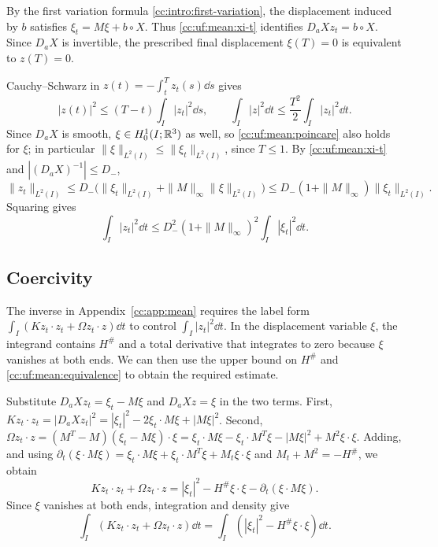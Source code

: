 By the first variation formula \eqref{cc:intro:first-variation}, the
displacement induced by $b$ satisfies $\xi_t=M\xi+b\circ X$.
Thus \eqref{cc:uf:mean:xi-t} identifies $D_aX z_t=b\circ X$.
Since $D_aX$ is invertible, the prescribed final displacement
$\xi(T)=0$ is equivalent to $z(T)=0$.

Cauchy--Schwarz in $z(t)=-\int_t^T z_t(s)\dd s$ gives
\begin{equation}\label{cc:uf:mean:poincare}
 |z(t)|^2\le(T-t)\int_I|z_t|^2\dd s,\qquad
 \int_I|z|^2\dd t\le\frac{T^2}{2}\int_I|z_t|^2\dd t.
\end{equation}
Since $D_aX$ is smooth, $\xi\in H^1_0(I;\mathbb R^3)$ as well, so
\eqref{cc:uf:mean:poincare} also holds for $\xi$; in particular
$\|\xi\|_{L^2(I)}\le\|\xi_t\|_{L^2(I)}$, since $T\le1$. By
\eqref{cc:uf:mean:xi-t} and $|(D_aX)^{-1}|\le D_-$,
\[
 \|z_t\|_{L^2(I)}
 \le D_-\bigl(\|\xi_t\|_{L^2(I)}+\|M\|_\infty\|\xi\|_{L^2(I)}\bigr)
 \le D_-(1+\|M\|_\infty)\|\xi_t\|_{L^2(I)}.
\]
Squaring gives
\begin{equation}\label{cc:uf:mean:equivalence}
 \int_I|z_t|^2\dd t\le D_-^2(1+\|M\|_\infty)^2\int_I|\xi_t|^2\dd t.
\end{equation}

\subsection{Coercivity}

The inverse in Appendix~\ref{cc:app:mean} requires the label form
$\int_I(Kz_t\cdot z_t+\Omega z_t\cdot z)\dd t$ to control
$\int_I|z_t|^2\dd t$. In the displacement variable $\xi$, the integrand
contains $H^\#$ and a total derivative that integrates to zero because
$\xi$ vanishes at both ends. We can then use the upper bound on $H^\#$ and
\eqref{cc:uf:mean:equivalence} to obtain the required estimate.

Substitute $D_aX z_t=\xi_t-M\xi$ and $D_aX z=\xi$ in the two terms. First,
$Kz_t\cdot z_t=|D_aX z_t|^2=|\xi_t|^2-2\xi_t\cdot M\xi+|M\xi|^2$. Second,
$\Omega z_t\cdot z=(M^T-M)(\xi_t-M\xi)\cdot\xi
=\xi_t\cdot M\xi-\xi_t\cdot M^T\xi-|M\xi|^2+M^2\xi\cdot\xi$. Adding,
and using
$\partial_t(\xi\cdot M\xi)=\xi_t\cdot M\xi+\xi_t\cdot M^T\xi+M_t\xi\cdot\xi$
and $M_t+M^2=-H^\#$, we obtain
\[
 Kz_t\cdot z_t+\Omega z_t\cdot z
 =|\xi_t|^2-H^\#\xi\cdot\xi-\partial_t(\xi\cdot M\xi).
\]
Since $\xi$ vanishes at both ends, integration and density give
\begin{equation}\label{cc:uf:mean:jacobi-id}
 \int_I(Kz_t\cdot z_t+\Omega z_t\cdot z)\dd t
 =\int_I(|\xi_t|^2-H^\#\xi\cdot\xi)\dd t.
\end{equation}

